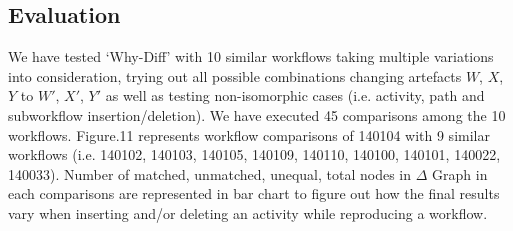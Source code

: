 \documentclass[10pt,conference,twocolumn]{IEEEtran}
\begin{document}
\subsection{Evaluation}
We have tested `Why-Diff' with 10 similar workflows taking multiple variations into consideration, trying out all possible combinations changing artefacts {$W$, $X$, $Y$} to {$W'$, $X'$, $Y'$} as well as testing non-isomorphic cases (i.e. activity, path and subworkflow insertion/deletion). We have executed 45 comparisons among the 10 workflows. Figure.11 represents workflow comparisons of 140104 with 9 similar workflows (i.e. 140102, 140103, 140105, 140109, 140110, 140100, 140101, 140022, 140033). Number of matched, unmatched, unequal, total nodes in $\Delta$ Graph in each comparisons are represented in bar chart to figure out how the final results vary when inserting and/or deleting an activity while reproducing a workflow.
  


\end{document}
